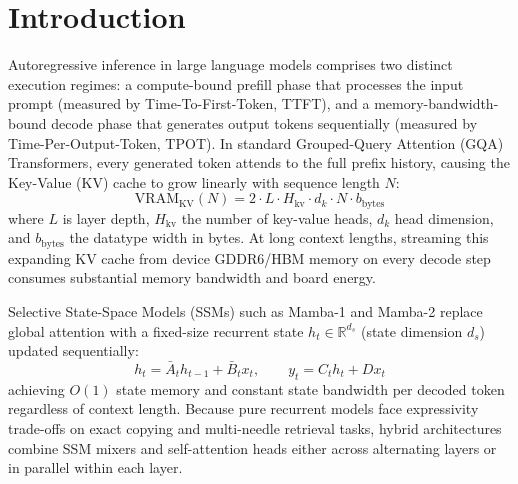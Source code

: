 \documentclass[10pt,a4paper]{article}
\begin{document}
\section{Introduction}
Autoregressive inference in large language models comprises two distinct execution regimes: a compute-bound prefill phase that processes the input prompt (measured by Time-To-First-Token, TTFT), and a memory-bandwidth-bound decode phase that generates output tokens sequentially (measured by Time-Per-Output-Token, TPOT). In standard Grouped-Query Attention (GQA) Transformers, every generated token attends to the full prefix history, causing the Key-Value (KV) cache to grow linearly with sequence length $N$:
\begin{equation}
\mathrm{VRAM}_{\mathrm{KV}}(N) = 2 \cdot L \cdot H_{\mathrm{kv}} \cdot d_k \cdot N \cdot b_{\mathrm{bytes}}
\end{equation}
where $L$ is layer depth, $H_{\mathrm{kv}}$ the number of key-value heads, $d_k$ head dimension, and $b_{\mathrm{bytes}}$ the datatype width in bytes. At long context lengths, streaming this expanding KV cache from device GDDR6/HBM memory on every decode step consumes substantial memory bandwidth and board energy.

Selective State-Space Models (SSMs) such as Mamba-1 and Mamba-2 replace global attention with a fixed-size recurrent state $h_t \in \mathbb{R}^{d_s}$ (state dimension $d_s$) updated sequentially:
\begin{equation}
h_t = \bar{A}_t h_{t-1} + \bar{B}_t x_t, \qquad y_t = C_t h_t + D x_t
\end{equation}
achieving $O(1)$ state memory and constant state bandwidth per decoded token regardless of context length. Because pure recurrent models face expressivity trade-offs on exact copying and multi-needle retrieval tasks, hybrid architectures combine SSM mixers and self-attention heads either across alternating layers or in parallel within each layer.
\end{document}
